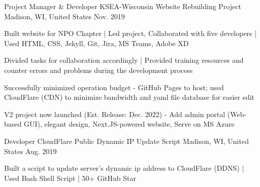 \begin{cventries}
  \cventry
  {Project Manager \& Developer} %
  {KSEA-Wisconsin Website Rebuilding Project} %
  {Madison, WI, United States} %
  {Nov. 2019} %
  {
    \begin{cvitems} %
      \item {Built website for NPO Chapter | Led project, Collaborated with five developers | Used HTML, CSS, Jekyll, Git, Jira, MS Teams, Adobe XD}
      \item {Divided tasks for collaboration accordingly | Provided training resources and counter errors and problems during the development process}
      \item {Successfully minimized operation budget - GitHub Pages to host; used CloudFlare (CDN) to minimize bandwidth and yaml file database for easier edit}
      \item {V2 project now launched (Est. Release: Dec. 2022) - Add admin portal (Web-based GUI), elegant design, Next.JS-powered website, Serve on MS Azure}
    \end{cvitems}
  }

  \cventry
  {Developer} %
  {CloudFlare Public Dynamic IP Update Script} %
  {Madison, WI, United States} %
  {Aug. 2019} %
  {
    \begin{cvitems} %
      \item {Built a script to update server's dynamic ip address to CloudFlare (DDNS) | Used Bash Shell Script | 50+ GitHub Star}
    \end{cvitems}
  }

\end{cventries}

